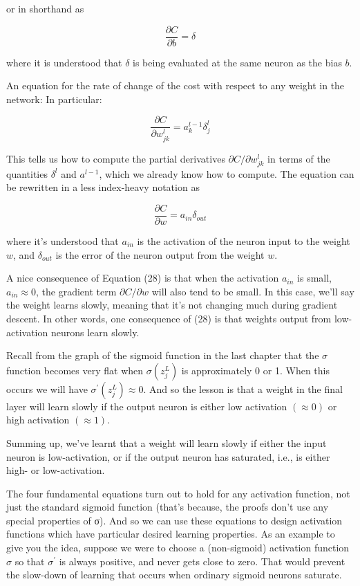 \documentclass[12 pt]{article}
\begin{document}
or in shorthand as

\begin{equation}
    \frac {\partial C}{\partial b} = \delta
\end{equation}

where it is understood that $ \delta $ is being evaluated at the same
neuron as the bias $ b $.

An equation for the rate of change of the cost with respect to any
weight in the network: In particular:

\begin{equation}
    \frac {\partial C}{\partial w^l_{jk}} = a^{l - 1}_k\delta^l_j
\end{equation}

This tells us how to compute the partial derivatives $ \partial C /
\partial w^l_{jk} $ in terms of the quantities $ \delta^l $
and $ a^{l - 1} $, which we already know how to compute. The
equation can be rewritten in a less index-heavy notation as

\begin{equation}
    \frac {\partial C}{\partial w} = a_{in} \delta_{out}
\end{equation}

where it's understood that $ a_{in} $ is the activation of the
neuron input to the weight $ w $, and $ \delta_{out} $ is the error
of the neuron output from the weight $ w $.

A nice consequence of Equation (28) is that when the activation
$ a_{in} $ is small, $ a_{in} \approx 0 $, the gradient term
$ \partial C / \partial w $ will also tend to be small. In this case,
we'll say the weight learns slowly, meaning that it's not changing much
during gradient descent. In other words, one consequence of (28) is that
weights output from low-activation neurons learn slowly.

Recall from the graph of the sigmoid function in the last chapter that
the $ \sigma $ function becomes very flat when $ \sigma (z^L_j) $
is approximately 0 or 1. When this occurs we will have
$ \sigma^{\prime}(z^L_j) \approx 0 $.
And so the lesson is that a weight in the final layer will learn slowly
if the output neuron is either low activation $ (\approx 0) $
or high activation $ (\approx 1) $.

Summing up, we've learnt that a weight will learn slowly if either the
input neuron is low-activation, or if the output neuron has saturated,
i.e., is either high- or low-activation.

The four fundamental equations turn out to hold for any activation
function, not just the standard sigmoid function (that's because, the
proofs don't use any special properties of σ). And so we can use these
equations to design activation functions which have particular desired
learning properties. As an example to give you the idea, suppose we were
to choose a (non-sigmoid) activation function $ \sigma $ so that $
\sigma^{\prime} $ is always positive, and never gets close to zero.
That would prevent the slow-down of learning that occurs when ordinary
sigmoid neurons saturate.
\end{document}
